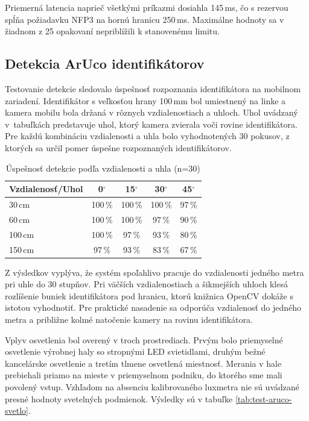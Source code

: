 Priemerná latencia naprieč všetkými príkazmi dosiahla 145\,ms, čo s rezervou spĺňa požiadavku NFP3 na hornú hranicu 250\,ms. Maximálne hodnoty sa v žiadnom z 25 opakovaní nepriblížili k stanovenému limitu.

\subsection{Detekcia ArUco identifikátorov}
\label{sec:detekcia-aruco}


Testovanie detekcie sledovalo úspešnosť rozpoznania identifikátora na mobilnom zariadení. Identifikátor s veľkosťou hrany 100\,mm bol umiestnený na linke a kamera mobilu bola držaná v rôznych vzdialenostiach a uhloch. Uhol uvádzaný v~tabuľkách predstavuje uhol, ktorý kamera zvierala voči rovine identifikátora. Pre každú kombináciu vzdialenosti a uhla bolo vyhodnotených 30 pokusov, z ktorých sa určil pomer úspešne rozpoznaných identifikátorov.

\begin{table}[H]
\centering
\caption{Úspešnosť detekcie podľa vzdialenosti a uhla (n=30)}
\label{tab:test-aruco-vzd}
\begin{tabular}{|l|c|c|c|c|}
\hline
\textbf{Vzdialenosť/Uhol} & \textbf{0$^{\circ}$} & \textbf{15$^{\circ}$} & \textbf{30$^{\circ}$} & \textbf{45$^{\circ}$} \\
\hline
30\,cm & 100\,\% & 100\,\% & 100\,\% & 97\,\% \\
60\,cm & 100\,\% & 100\,\% & 97\,\% & 90\,\% \\
100\,cm & 100\,\% & 97\,\% & 93\,\% & 80\,\% \\
150\,cm & 97\,\% & 93\,\% & 83\,\% & 67\,\% \\
\hline
\end{tabular}
\end{table}

Z výsledkov vyplýva, že systém spoľahlivo pracuje do vzdialenosti jedného metra pri uhle do 30 stupňov. Pri väčších vzdialenostiach a šikmejších uhloch klesá rozlíšenie buniek identifikátora pod hranicu, ktorú knižnica OpenCV dokáže s istotou vyhodnotiť. Pre praktické nasadenie sa odporúča vzdialenosť do jedného metra a približne kolmé natočenie kamery na rovinu identifikátora.

Vplyv osvetlenia bol overený v troch prostrediach. Prvým bolo priemyselné osvetlenie výrobnej haly so stropnými LED svietidlami, druhým bežné kancelárske osvetlenie a tretím tlmene osvetlená miestnosť. 
Merania v hale prebiehali priamo na mieste v priemyselnom podniku, do ktorého sme mali povolený vstup. Vzhľadom na absenciu kalibrovaného luxmetra nie sú uvádzané presné hodnoty svetelných podmienok. Výsledky sú v tabuľke \ref{tab:test-aruco-svetlo}.

